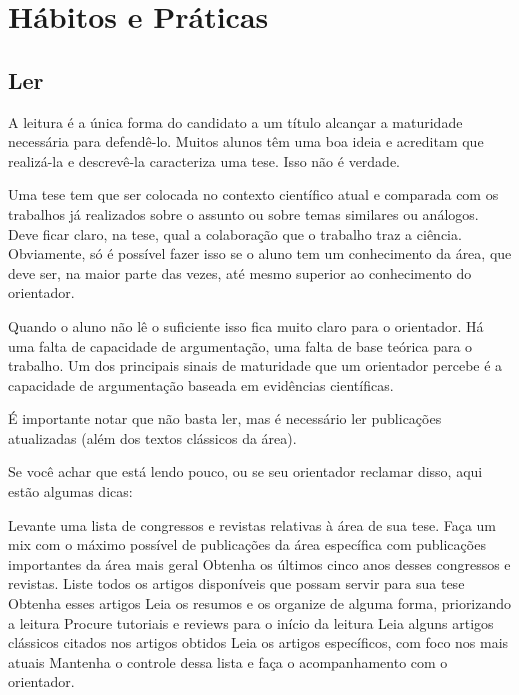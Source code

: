 \chapter{Hábitos e Práticas}


\section{Ler}


A leitura é a única forma do candidato a um título alcançar a maturidade necessária para defendê-lo. Muitos alunos têm uma boa ideia e acreditam que realizá-la e descrevê-la caracteriza uma tese. Isso não é verdade. 




Uma tese tem que ser colocada no contexto científico atual e comparada com os trabalhos já realizados sobre o assunto ou sobre temas similares ou análogos. Deve ficar claro, na tese, qual a colaboração que o trabalho traz a ciência. Obviamente, só é possível fazer isso se o aluno tem um conhecimento da área, que deve ser, na maior parte das vezes, até mesmo superior ao conhecimento do orientador.


Quando o aluno não lê o suficiente isso fica muito claro para o orientador. Há uma falta de capacidade de argumentação, uma falta de base teórica para o trabalho. Um dos principais sinais de maturidade que um orientador percebe é a capacidade de argumentação baseada em evidências científicas.


É importante notar que não basta ler, mas é necessário ler publicações atualizadas (além dos textos clássicos da área).


Se você achar que está lendo pouco, ou se seu orientador reclamar disso, aqui estão algumas dicas:

\begin{outline}	
\1	Levante uma lista de congressos e revistas relativas à área de sua tese.
\2	Faça um mix com o máximo possível de publicações da área específica com publicações importantes da área mais geral
\1	Obtenha os últimos cinco anos desses congressos e revistas.
\1	Liste todos os artigos disponíveis que possam servir para sua tese
\1	Obtenha esses artigos
\1	Leia os resumos e os organize de alguma forma, priorizando a leitura
\2	Procure tutoriais e reviews para o início da leitura
\2	Leia alguns artigos clássicos citados nos artigos obtidos
\2 Leia os artigos específicos, com foco nos mais atuais
\1	Mantenha o controle dessa lista e faça o acompanhamento com o orientador.
\end{outline}

